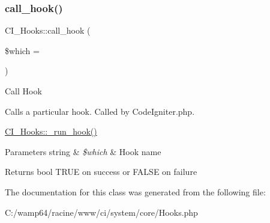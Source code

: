 \subsubsection{\texorpdfstring{call\+\_\+hook()}{call\_hook()}}
{\footnotesize\ttfamily C\+I\+\_\+\+Hooks\+::call\+\_\+hook (\begin{DoxyParamCaption}\item[{}]{\$which = {\ttfamily \textquotesingle{}\textquotesingle{}} }\end{DoxyParamCaption})}

Call Hook

Calls a particular hook. Called by Code\+Igniter.\+php.

\mbox{\hyperlink{class_c_i___hooks_ac1ac99a9f45cc07eff8434763e066a5d}{C\+I\+\_\+\+Hooks\+::\+\_\+run\+\_\+hook()}}


\begin{DoxyParams}[1]{Parameters}
string & {\em \$which} & Hook name \\
\hline
\end{DoxyParams}
\begin{DoxyReturn}{Returns}
bool T\+R\+UE on success or F\+A\+L\+SE on failure 
\end{DoxyReturn}


The documentation for this class was generated from the following file\+:\begin{DoxyCompactItemize}
\item 
C\+:/wamp64/racine/www/ci/system/core/Hooks.\+php\end{DoxyCompactItemize}
